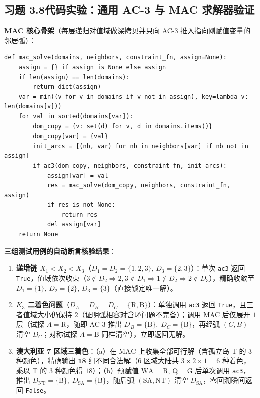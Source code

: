 \subsection*{习题 3.8\quad 代码实验：通用 AC-3 与 MAC 求解器验证}
\textbf{MAC 核心骨架}（每层递归对值域做深拷贝并只向 AC-3 推入指向刚赋值变量的邻居弧）：
\begin{lstlisting}
def mac_solve(domains, neighbors, constraint_fn, assign=None):
    assign = {} if assign is None else assign
    if len(assign) == len(domains):
        return dict(assign)
    var = min((v for v in domains if v not in assign), key=lambda v: len(domains[v]))
    for val in sorted(domains[var]):
        dom_copy = {v: set(d) for v, d in domains.items()}
        dom_copy[var] = {val}
        init_arcs = [(nb, var) for nb in neighbors[var] if nb not in assign]
        if ac3(dom_copy, neighbors, constraint_fn, init_arcs):
            assign[var] = val
            res = mac_solve(dom_copy, neighbors, constraint_fn, assign)
            if res is not None:
                return res
            del assign[var]
    return None
\end{lstlisting}
\textbf{三组测试用例的自动断言核验结果}：
\begin{enumerate}[label=\arabic*., leftmargin=1.8em]
  \item \textbf{递增链 $X_1 < X_2 < X_3$}（$D_1=D_2=\{1,2,3\},\, D_3=\{2,3\}$）：单次 \texttt{ac3} 返回 \texttt{True}，值域依次收束（$3\notin D_2 \Rightarrow 2,3\notin D_1 \Rightarrow 1\notin D_2 \Rightarrow 2\notin D_3$），精确收敛至 $D_1=\{1\},\, D_2=\{2\},\, D_3=\{3\}$（直接锁定唯一解）。
  \item \textbf{$K_3$ 二着色问题}（$D_A=D_B=D_C=\{\text{R},\text{B}\}$）：单独调用 \texttt{ac3} 返回 \texttt{True}，且三者值域大小仍保持 $2$（证明弧相容对含环问题不完备）；调用 MAC 后仅展开 $1$ 层（试探 $A=\text{R}$，随即 AC-3 推出 $D_B=\{\text{B}\},\; D_C=\{\text{B}\}$，再经弧 $(C,B)$ 清空 $D_C$；对称试探 $A=\text{B}$ 同样清空），立即返回无解。
  \item \textbf{澳大利亚 7 区域三着色}：（a）在 MAC 上收集全部可行解（含孤立岛 \textsf{T} 的 $3$ 种颜色），精确输出 $\mathbf{18}$ 组不同合法解（6 区域大陆共 $3 \times 2 \times 1 = 6$ 种着色，乘以 \textsf{T} 的 $3$ 种颜色得 $18$）；（b）预赋值 $\text{WA}=\text{R},\, \text{Q}=\text{G}$ 后单次调用 \texttt{ac3}，推出 $D_{\text{NT}}=\{\text{B}\},\; D_{\text{SA}}=\{\text{B}\}$，随后弧 $(\text{SA}, \text{NT})$ 清空 $D_{\text{SA}}$，零回溯瞬间返回 \texttt{False}。
\end{enumerate}

